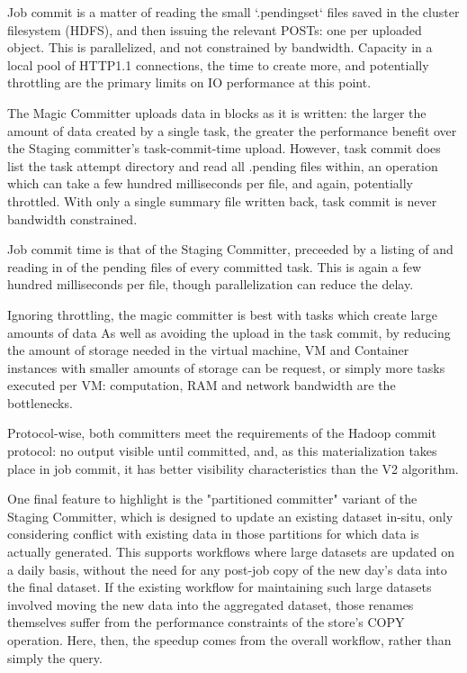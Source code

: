 \documentclass[conference]{IEEEtran}
\begin{document}
Job commit is a matter of reading the small `.pendingset` files saved in the
cluster filesystem (HDFS), and then issuing the relevant POSTs: one per uploaded
object.
This is parallelized, and not constrained by bandwidth.
Capacity in a local pool of HTTP1.1 connections, the time to create more,
and potentially throttling are the primary limits on IO performance at this point.

The Magic Committer uploads data in blocks as it is written: the larger
the amount of data created by a single task, the greater the performance
benefit over the Staging committer's task-commit-time upload.
However, task commit does list the task attempt directory and read all .pending
files within, an operation which can take a few hundred milliseconds per file,
and again, potentially throttled.
With only a single summary file written back, task commit is never
bandwidth constrained.

Job commit time is that of the Staging Committer, preceeded by a listing
of and reading in of the pending files of every committed task.
This is again a few hundred milliseconds per file, though parallelization
can reduce the delay.

Ignoring throttling, the magic committer is best with tasks which create
large amounts of data
As well as avoiding the upload in the task commit, by reducing the
amount of storage needed in the virtual machine, VM and Container instances
with smaller amounts of storage can be request, or simply more tasks executed
per VM: computation, RAM and network bandwidth are the bottlenecks.

Protocol-wise, both committers meet the requirements of the Hadoop commit
protocol: no output visible until committed, and, as this materialization
takes place in job commit, it has better visibility characteristics than
the V2 algorithm.

One final feature to highlight is the "partitioned committer" variant
of the Staging Committer, which is designed to update an existing
dataset in-situ, only considering conflict with existing data in
those partitions for which data is actually generated.
This supports workflows where large datasets are updated on a daily basis,
without the need for any post-job copy of the new day's data into the
final dataset.
If the existing workflow for maintaining such large datasets involved
moving the new data into the aggregated dataset, those renames themselves
suffer from the performance constraints of the store's COPY operation.
Here, then, the speedup comes from the overall workflow, rather than
simply the query.
\end{document}
